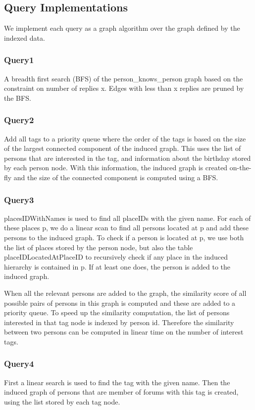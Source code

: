 \documentclass{article}
\begin{document}
\subsection{Query Implementations}

We implement each query as a graph algorithm over the graph defined by
the indexed data.

\subsubsection{Query1} A breadth first search (BFS) of the
person\_knows\_person graph based on the constraint on number of replies
x.  Edges with less than x replies are pruned by the BFS.

\subsubsection{Query2} Add all tags to a priority queue where the order of
the tags is based on the size of the largest connected component of
the induced graph. This uses the list of persons that are interested in the 
tag, and information about the birthday stored by each person node. With
this information, the induced graph is created on-the-fly and the size 
of the connected component is computed using a BFS.
              
\subsubsection{Query3} placesIDWithNames is used to find all placeIDs with
the given name. For each of these places p, we do a linear scan to find 
all persons located at p and add these persons to the induced graph. 
To check if a person is located at p, we use both the 
list of places stored by the person node, but also the table 
placeIDLocatedAtPlaceID to recursively check if any place 
in the induced hierarchy is contained in p. If at least one does, 
the person is added to the induced graph.
              
When all the relevant persons are added to the graph, 
the similarity score of all possible pairs of persons in this
graph is computed and these are added to a priority queue. To speed up
the similarity computation, the list of persons
interested in that tag node is indexed by person id. 
Therefore the similarity between two persons can be computed in 
linear time on the number of interest tags.
              
\subsubsection{Query4} First a linear search is used to find the tag with
the given name. Then the induced graph of persons that are member of
forums with this tag is created, using the list stored by each tag node.
               
\end{document}

